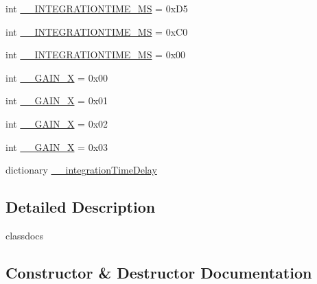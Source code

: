 \begin{DoxyCompactItemize}
\item 
int \hyperlink{classlibsensorPy_1_1concretesensor_1_1tcs34725_1_1TCS34725_a990eb49dbbfea22f3a9a151d649d997d}{\+\_\+\+\_\+\+I\+N\+T\+E\+G\+R\+A\+T\+I\+O\+N\+T\+I\+M\+E\+\_\+M\+S} = 0x\+D5
\item 
int \hyperlink{classlibsensorPy_1_1concretesensor_1_1tcs34725_1_1TCS34725_a706823c6849efd638a61b0e5fd8fdf86}{\+\_\+\+\_\+\+I\+N\+T\+E\+G\+R\+A\+T\+I\+O\+N\+T\+I\+M\+E\+\_\+M\+S} = 0x\+C0
\item 
int \hyperlink{classlibsensorPy_1_1concretesensor_1_1tcs34725_1_1TCS34725_a365a28fc4bdd00324fd1baa7e2a11478}{\+\_\+\+\_\+\+I\+N\+T\+E\+G\+R\+A\+T\+I\+O\+N\+T\+I\+M\+E\+\_\+M\+S} = 0x00
\item 
int \hyperlink{classlibsensorPy_1_1concretesensor_1_1tcs34725_1_1TCS34725_a1f103785491e464b1a3ae716b1790acb}{\+\_\+\+\_\+\+G\+A\+I\+N\+\_\+X} = 0x00
\item 
int \hyperlink{classlibsensorPy_1_1concretesensor_1_1tcs34725_1_1TCS34725_a3a28cc90941be937af25b38e12bf93d4}{\+\_\+\+\_\+\+G\+A\+I\+N\+\_\+X} = 0x01
\item 
int \hyperlink{classlibsensorPy_1_1concretesensor_1_1tcs34725_1_1TCS34725_ab32e649eb7bf140abfae3fb10becb93e}{\+\_\+\+\_\+\+G\+A\+I\+N\+\_\+X} = 0x02
\item 
int \hyperlink{classlibsensorPy_1_1concretesensor_1_1tcs34725_1_1TCS34725_ac32eab1d0bf66a33574e8924f71244a8}{\+\_\+\+\_\+\+G\+A\+I\+N\+\_\+X} = 0x03
\item 
dictionary \hyperlink{classlibsensorPy_1_1concretesensor_1_1tcs34725_1_1TCS34725_a21bdcdb2b1932e8a0944dd1f7fad3676}{\+\_\+\+\_\+integration\+Time\+Delay}
\end{DoxyCompactItemize}


\subsection{Detailed Description}
\begin{DoxyVerb}classdocs
\end{DoxyVerb}
 

\subsection{Constructor \& Destructor Documentation}
\hypertarget{classlibsensorPy_1_1concretesensor_1_1tcs34725_1_1TCS34725_a28e4a65404940502ca253b1c2681f54c}{}
